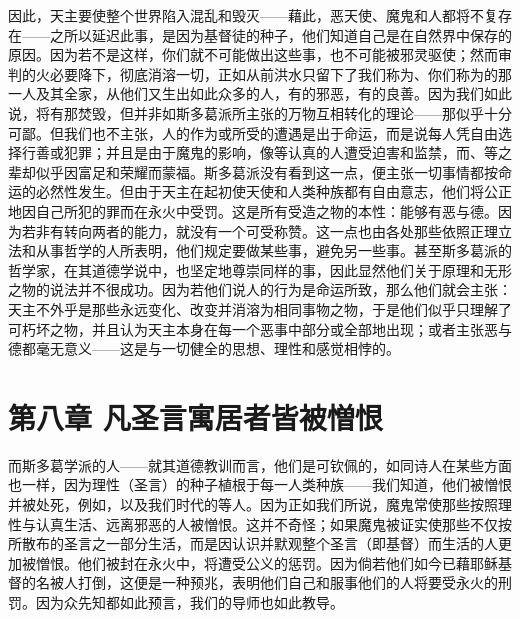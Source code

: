 因此，天主要使整个世界陷入混乱和毁灭——藉此，恶天使、魔鬼和人都将不复存在——之所以延迟此事，是因为基督徒的种子，他们知道自己是在自然界中保存的原因。因为若不是这样，你们就不可能做出这些事，也不可能被邪灵驱使；然而审判的火必要降下，彻底消溶一切，正如从前洪水只留下了我们称为、你们称为的那一人及其全家，从他们又生出如此众多的人，有的邪恶，有的良善。因为我们如此说，将有那焚毁，但并非如斯多葛派所主张的万物互相转化的理论——那似乎十分可鄙。但我们也不主张，人的作为或所受的遭遇是出于命运，而是说每人凭自由选择行善或犯罪；并且是由于魔鬼的影响，像等认真的人遭受迫害和监禁，而、等之辈却似乎因富足和荣耀而蒙福。斯多葛派没有看到这一点，便主张一切事情都按命运的必然性发生。但由于天主在起初使天使和人类种族都有自由意志，他们将公正地因自己所犯的罪而在永火中受罚。这是所有受造之物的本性：能够有恶与德。因为若非有转向两者的能力，就没有一个可受称赞。这一点也由各处那些依照正理立法和从事哲学的人所表明，他们规定要做某些事，避免另一些事。甚至斯多葛派的哲学家，在其道德学说中，也坚定地尊崇同样的事，因此显然他们关于原理和无形之物的说法并不很成功。因为若他们说人的行为是命运所致，那么他们就会主张：天主不外乎是那些永远变化、改变并消溶为相同事物之物，于是他们似乎只理解了可朽坏之物，并且认为天主本身在每一个恶事中部分或全部地出现；或者主张恶与德都毫无意义——这是与一切健全的思想、理性和感觉相悖的。\par


\section{第八章 凡圣言寓居者皆被憎恨}

而斯多葛学派的人——就其道德教训而言，他们是可钦佩的，如同诗人在某些方面也一样，因为理性（圣言）的种子植根于每一人类种族——我们知道，他们被憎恨并被处死，例如，以及我们时代的等人。因为正如我们所说，魔鬼常使那些按照理性与认真生活、远离邪恶的人被憎恨。这并不奇怪；如果魔鬼被证实使那些不仅按所散布的圣言之一部分生活，而是因认识并默观整个圣言（即基督）而生活的人更加被憎恨。他们被封在永火中，将遭受公义的惩罚。因为倘若他们如今已藉耶稣基督的名被人打倒，这便是一种预兆，表明他们自己和服事他们的人将要受永火的刑罚。因为众先知都如此预言，我们的导师也如此教导。\par


